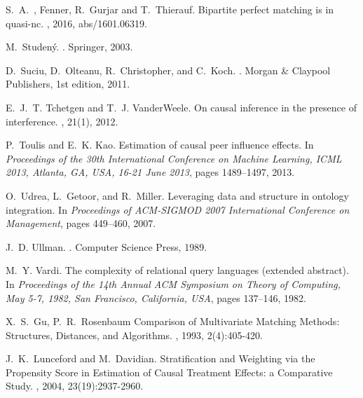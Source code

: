 \begin{thebibliography}{10}
S.~A.~, Fenner, R.~Gurjar and T.~Thierauf.
\newblock Bipartite perfect matching
is in quasi-nc.
, 2016, abs/1601.06319.

M.~Studen\'y.
.
\newblock Springer, 2003.

D.~Suciu, D.~Olteanu, R.~Christopher, and C.~Koch.
.
\newblock Morgan \& Claypool Publishers, 1st edition, 2011.

E.~J.~T. Tchetgen and T.~J. Vander{W}eele.
\newblock On causal inference in the presence of interference.
, 21(1), 2012.

P.~Toulis and E.~K. Kao.
\newblock Estimation of causal peer influence effects.
\newblock In {\em Proceedings of the 30th International Conference on Machine
  Learning, {ICML} 2013, Atlanta, GA, USA, 16-21 June 2013}, pages 1489--1497,
  2013.

O.~Udrea, L.~Getoor, and R.~Miller.
\newblock Leveraging data and structure in ontology integration.
\newblock In {\em Proceedings of ACM-SIGMOD 2007 International Conference on
  Management}, pages 449--460, 2007.

J.~D. Ullman.
.
\newblock Computer Science Press, 1989.

M.~Y. Vardi.
\newblock The complexity of relational query languages (extended abstract).
\newblock In {\em Proceedings of the 14th Annual {ACM} Symposium on Theory of
  Computing, May 5-7, 1982, San Francisco, California, {USA}}, pages 137--146,
  1982.


X.~S.~Gu,  P.~R.~Rosenbaum
\newblock Comparison of Multivariate Matching Methods: Structures,
Distances, and Algorithms.
, 1993,  2(4):405-420.



J.~K.~Lunceford and M.~Davidian.
\newblock Stratification and Weighting via the Propensity Score in Estimation of Causal Treatment Effects: a Comparative Study.
, 2004, 23(19):2937-2960.







\end{thebibliography}
